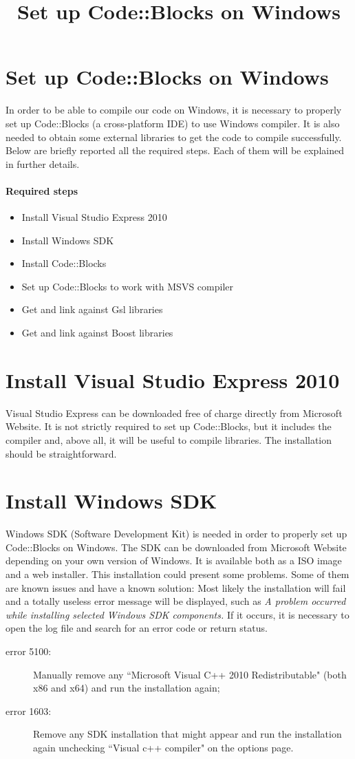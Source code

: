 \documentclass[12pt,a4paper]{report}
\begin{document}
\title{Set up Code::Blocks on Windows}
\maketitle
\section*{Set up Code::Blocks on Windows}
In order to be able to compile our code on Windows, it is necessary to properly set up Code::Blocks (a cross-platform IDE) to use Windows compiler. It is also needed to obtain some external libraries to get the code to compile successfully.  Below are briefly reported all the required steps. Each of them will be explained in further details.
\paragraph{Required steps}
\begin{itemize}
\item Install Visual Studio Express 2010
\item Install Windows SDK
\item Install Code::Blocks
\item Set up Code::Blocks to work with MSVS compiler
\item Get and link against Gsl libraries
\item Get and link against Boost libraries
\end{itemize}
\section*{Install Visual Studio Express 2010}
\label{Install Visual Studio}
Visual Studio Express can be downloaded free of charge directly from Microsoft Website. It is not strictly required to set up Code::Blocks, but it includes the compiler and, above all, it will be useful to compile libraries.
The installation should be straightforward.
\section*{Install Windows SDK}
\label{Install SDK}
Windows SDK (Software Development Kit) is needed in order to properly set up Code::Blocks on Windows. The SDK can be downloaded from Microsoft Website depending on your own version of Windows. It is available both as a ISO image and a web installer.
This installation could present some problems. Some of them are known issues and have a known solution:
Most likely the installation will fail and a totally useless error message will be displayed, such as \emph{A problem occurred while installing selected Windows SDK components.} If it occurs, it is necessary to open the log file and search for an error code or return status.
\begin{description}
\item [error 5100:] Manually remove any ``Microsoft Visual C++ 2010 Redistributable" (both x86 and x64) and run the installation again;
\item[error 1603:] Remove any SDK installation that might appear and run the installation again unchecking ``Visual c++ compiler" on the options page.
\end{description}
\end{document}
